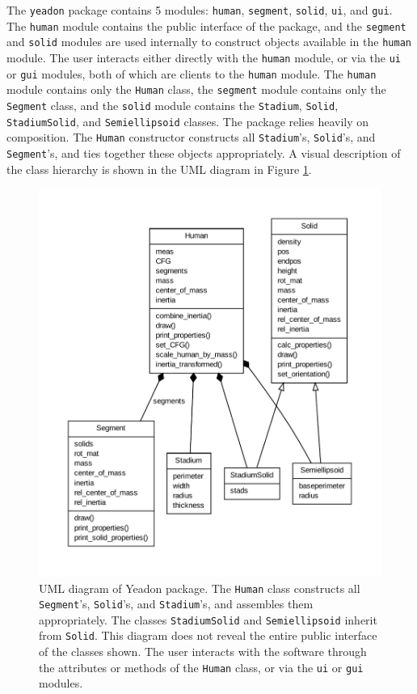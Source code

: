 \documentclass[10pt,a4paper,twocolumn]{article}
\begin{document}
The \verb+yeadon+ package contains 5 modules: \verb+human+, \verb+segment+,
\verb+solid+, \verb+ui+, and \verb+gui+. The \verb+human+ module contains the
public interface of the package, and the \verb+segment+ and \verb+solid+
modules are used internally to construct objects available in the \verb+human+
module. The user interacts either directly with the \verb+human+ module, or via
the \verb+ui+ or \verb+gui+ modules, both of which are clients to the
\verb+human+ module. The \verb+human+ module contains only the \verb+Human+
class, the \verb+segment+ module contains only the \verb+Segment+ class, and
the \verb+solid+ module contains the \verb+Stadium+, \verb+Solid+,
\verb+StadiumSolid+, and \verb+Semiellipsoid+ classes. The package relies
heavily on composition. The \verb+Human+ constructor constructs all
\verb+Stadium+'s, \verb+Solid+'s, and \verb+Segment+'s, and ties together these
objects appropriately. A visual description of the class hierarchy is shown in
the UML diagram in Figure \ref{fig:umldiagram}.

\begin{figure}
  \begin{center}
    \includegraphics[width=\columnwidth]{figures/umldiagram.pdf}
  \end{center}
  \cprotect\caption{
    UML diagram of Yeadon package. The \verb+Human+ class constructs all
    \verb+Segment+'s, \verb+Solid+'s, and \verb+Stadium+'s, and assembles them
    appropriately. The classes \verb+StadiumSolid+ and \verb+Semiellipsoid+
    inherit from \verb+Solid+.  This diagram does not reveal the entire public
    interface of the classes shown. The user interacts with the software
    through the attributes or methods of the \verb+Human+ class, or via the
    \verb+ui+ or \verb+gui+ modules.
  }
  \label{fig:umldiagram}
\end{figure}
\end{document}
